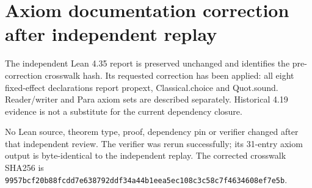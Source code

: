 \documentclass{article}
\begin{document}
\section*{Axiom documentation correction after independent replay}
The independent Lean 4.35 report is preserved unchanged and identifies the pre-correction crosswalk hash. Its requested correction has been applied: all eight fixed-effect declarations report propext, Classical.choice and Quot.sound. Reader/writer and Para axiom sets are described separately. Historical 4.19 evidence is not a substitute for the current dependency closure.

No Lean source, theorem type, proof, dependency pin or verifier changed after that independent review. The verifier was rerun successfully; its 31-entry axiom output is byte-identical to the independent replay. The corrected crosswalk SHA256 is \texttt{9957bcf20b88fcdd7e638792ddf34a44b1eea5ec108c3c58c7f4634608ef7e5b}.
\end{document}
